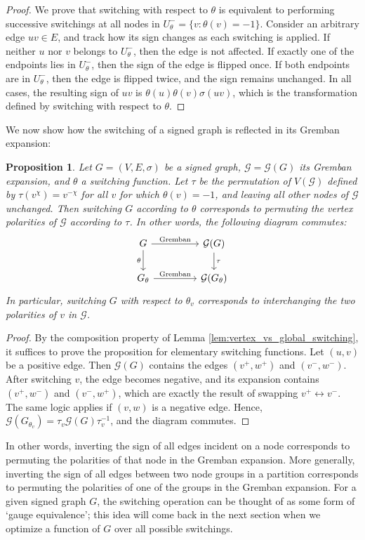 \documentclass[reprint,onecolumn]{article}
\newtheorem{proposition}[theorem]{Proposition}
\newcommand{\mc}[1]{\mathcal{#1}}
\newcommand{\1}{\mathbb{1}}
\newcommand{\0}{\mathbf{0}}
\begin{document}
\begin{proof}
We prove that switching with respect to \( \theta \) is equivalent to performing successive switchings at all nodes in \( U^-_\theta=\{v:\theta(v)=-1\}\).
Consider an arbitrary edge \( uv \in E \), and track how its sign changes as each switching is applied. If neither \( u \) nor \( v \) belongs to \( U^-_\theta \), then the edge is not affected. If exactly one of the endpoints lies in \( U^-_\theta \), then the sign of the edge is flipped once. If both endpoints are in \( U^-_\theta \), then the edge is flipped twice, and the sign remains unchanged. In all cases, the resulting sign of \( uv \) is \( \theta(u) \theta(v) \sigma(uv) \), which is the transformation defined by switching with respect to \( \theta \). 
\end{proof}
We now show how the switching of a signed graph is reflected in its Gremban expansion:
\begin{proposition}  \label{prop:switching_permutation}
Let \( G = (V,E,\sigma) \) be a signed graph, $\mathcal{G} = \mathcal{G}(G)$ its Gremban expansion, and $\theta$ a switching function. Let $\tau$ be the permutation of $V(\mathcal{G})$ defined by $\tau(v^{\chi})=v^{-\chi}$ for all $v$ for which $\theta(v)=-1$, and leaving all other nodes of $\mathcal{G}$ unchanged. Then switching $G$ according to $\theta$ corresponds to permuting the vertex polarities of $\mathcal{G}$ according to $\tau$. In other words, the following diagram commutes:
$$
    \begin{tikzcd}
    G \arrow{r}{\text{Gremban}} \arrow[swap]{d}{\theta} &[2em] \mathcal{G}(G) \arrow{d}{\tau} 
    \\
    G_\theta \arrow{r}{\text{Gremban}} & \mathcal{G}(G_{\theta})
    \end{tikzcd}
$$
In particular, switching $G$ with respect to $\theta_v$ corresponds to interchanging the two polarities of $v$ in $\mathcal{G}$.
\end{proposition}

\begin{proof}
By the composition property of Lemma \ref{lem:vertex_vs_global_switching}, it suffices to prove the proposition for elementary switching functions. Let $(u,v)$ be a positive edge. Then \( \mc G(G) \) contains the edges \( (v^+, w^+) \) and \( (v^-, w^-) \). After switching \( v \), the edge becomes negative, and its expansion contains \( (v^+, w^-) \) and \( (v^-, w^+) \), which are exactly the result of swapping \( v^+ \leftrightarrow v^- \). The same logic applies if \( (v, w)\) is a negative edge. Hence, \( \mc G(G_{\theta_v}) = \tau_v \mc G(G) \tau_v^{-1} \), and the diagram commutes.
\end{proof}
In other words, inverting the sign of all edges incident on a node corresponds to permuting the polarities of that node in the Gremban expansion. More generally, inverting the sign of all edges between two node groups in a partition corresponds to permuting the polarities of one of the groups in the Gremban expansion. For a given signed graph $G$, the switching operation can be thought of as some form of `gauge equivalence'; this idea will come back in the next section when we optimize a function of $G$ over all possible switchings.
    
\end{document}
